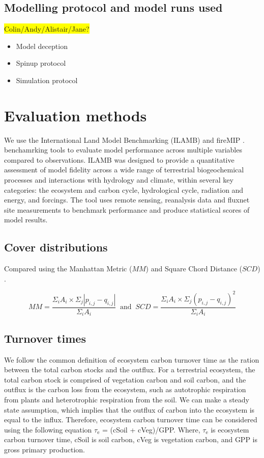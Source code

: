\documentclass[bg, manuscript]{copernicus}
\newcommand{\hilight}[1]{\colorbox{yellow}{#1}}
\begin{document}
\subsection{Modelling protocol and model runs used}
\hilight{Colin/Andy/Alistair/Jane?}
\begin{itemize}
    \item Model deception \citep{Sellar2019-bo}
    \item Spinup protocol \citep{yool2020spin}
    \item Simulation protocol \citep{sellar2020implementation}
\end{itemize}

\section{Evaluation methods}

We use the International Land Model Benchmarking (ILAMB) \citep{Collier2018-ai} and fireMIP \citep{Kelley2013-ey, rabin2017fire}. benchamrking tools to evaluate model performance across multiple variables compared to observations. ILAMB was designed to provide a quantitative assessment of model fidelity across a wide range of terrestrial biogeochemical processes and interactions with hydrology and climate, within several key categories: the ecosystem and carbon cycle, hydrological cycle, radiation and energy, and forcings. The tool uses remote sensing, reanalysis data and fluxnet site measurements to benchmark performance and produce statistical scores of model results. 


\subsection{Cover distributions}
Compared using the Manhattan Metric ($MM$) and Square Chord Distance ($SCD$) \citep{Kelley2013-ey}.

\begin{equation}
    MM = \frac{\Sigma_i A_i \times \Sigma_j  |p_{i,j} - q_{i,j} |}{\Sigma_i A_i} \  \text{   and   } \
    SCD = \frac{\Sigma_i A_i \times \Sigma_j (p_{i,j} - q_{i,j} )^2}{\Sigma_i A_i}
\end{equation}

\subsection{Turnover times}
We follow the common definition of ecosystem carbon turnover time as the ration between the total carbon stocks and the outflux. For a terrestrial ecosystem, the total carbon stock is comprised of vegetation carbon and soil carbon, and the outflux is the carbon loss from the ecosystem, such as autotrophic respiration from plants and heterotrophic respiration from the soil. We can make a steady state assumption, which implies that the outflux of carbon into the ecosystem is equal to the influx.  Therefore, ecosystem carbon turnover time can be considered using the following equation $\tau_\mathrm{e}$ = (cSoil + cVeg)/GPP. Where, $\tau_\mathrm{e}$ is ecosystem carbon turnover time, cSoil is soil carbon, cVeg is vegetation carbon, and GPP is gross primary production.
\end{document}
